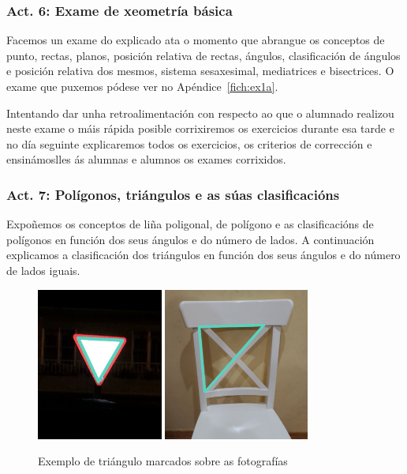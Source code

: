 \subsubsection{Act. 6: Exame de xeometría básica}
Facemos un exame do explicado ata o momento que abrangue os conceptos de punto, rectas, planos, posición relativa de rectas, ángulos, clasificación de ángulos e posición relativa dos mesmos, sistema sesaxesimal, mediatrices e bisectrices. O exame que puxemos pódese ver no Apéndice~\ref{fich:ex1a}.

Intentando dar unha retroalimentación con respecto ao que o alumnado realizou neste exame o máis rápida posible corrixiremos os exercicios durante esa tarde e no día seguinte explicaremos todos os exercicios, os criterios de corrección e ensinámoslles ás alumnas e alumnos os exames corrixidos.

\subsubsection{Act. 7: Polígonos, triángulos e as súas clasificacións}\label{act7}
Expoñemos os conceptos de liña poligonal, de polígono e as clasificacións de polígonos en función dos seus ángulos e do número de lados. A continuación explicamos a clasificación dos triángulos en función dos seus ángulos e do número de lados iguais.

\begin{figure}[h!]
  \centering
  \includegraphics[height=5cm]{img/trian1.jpg}
  \includegraphics[height=5cm]{img/trian2.jpg}
  \caption{Exemplo de triángulo marcados sobre as fotografías}\label{fig:act7}
\end{figure}


